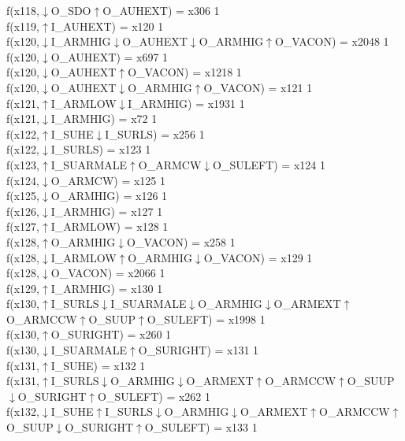 f(x118,$\downarrow$O\_SDO$\uparrow$O\_AUHEXT) = x306 {1} \\
f(x119,$\uparrow$I\_AUHEXT) = x120 {1} \\
f(x120,$\downarrow$I\_ARMHIG$\downarrow$O\_AUHEXT$\downarrow$O\_ARMHIG$\uparrow$O\_VACON) = x2048 {1} \\
f(x120,$\downarrow$O\_AUHEXT) = x697 {1} \\
f(x120,$\downarrow$O\_AUHEXT$\uparrow$O\_VACON) = x1218 {1} \\
f(x120,$\downarrow$O\_AUHEXT$\downarrow$O\_ARMHIG$\uparrow$O\_VACON) = x121 {1} \\
f(x121,$\uparrow$I\_ARMLOW$\downarrow$I\_ARMHIG) = x1931 {1} \\
f(x121,$\downarrow$I\_ARMHIG) = x72 {1} \\
f(x122,$\uparrow$I\_SUHE$\downarrow$I\_SURLS) = x256 {1} \\
f(x122,$\downarrow$I\_SURLS) = x123 {1} \\
f(x123,$\uparrow$I\_SUARMALE$\uparrow$O\_ARMCW$\downarrow$O\_SULEFT) = x124 {1} \\
f(x124,$\downarrow$O\_ARMCW) = x125 {1} \\
f(x125,$\downarrow$O\_ARMHIG) = x126 {1} \\
f(x126,$\downarrow$I\_ARMHIG) = x127 {1} \\
f(x127,$\uparrow$I\_ARMLOW) = x128 {1} \\
f(x128,$\uparrow$O\_ARMHIG$\downarrow$O\_VACON) = x258 {1} \\
f(x128,$\downarrow$I\_ARMLOW$\uparrow$O\_ARMHIG$\downarrow$O\_VACON) = x129 {1} \\
f(x128,$\downarrow$O\_VACON) = x2066 {1} \\
f(x129,$\uparrow$I\_ARMHIG) = x130 {1} \\
f(x130,$\uparrow$I\_SURLS$\downarrow$I\_SUARMALE$\downarrow$O\_ARMHIG$\downarrow$O\_ARMEXT$\uparrow$O\_ARMCCW$\uparrow$O\_SUUP$\uparrow$O\_SULEFT) = x1998 {1} \\
f(x130,$\uparrow$O\_SURIGHT) = x260 {1} \\
f(x130,$\downarrow$I\_SUARMALE$\uparrow$O\_SURIGHT) = x131 {1} \\
f(x131,$\uparrow$I\_SUHE) = x132 {1} \\
f(x131,$\uparrow$I\_SURLS$\downarrow$O\_ARMHIG$\downarrow$O\_ARMEXT$\uparrow$O\_ARMCCW$\uparrow$O\_SUUP$\downarrow$O\_SURIGHT$\uparrow$O\_SULEFT) = x262 {1} \\
f(x132,$\downarrow$I\_SUHE$\uparrow$I\_SURLS$\downarrow$O\_ARMHIG$\downarrow$O\_ARMEXT$\uparrow$O\_ARMCCW$\uparrow$O\_SUUP$\downarrow$O\_SURIGHT$\uparrow$O\_SULEFT) = x133 {1} \\
